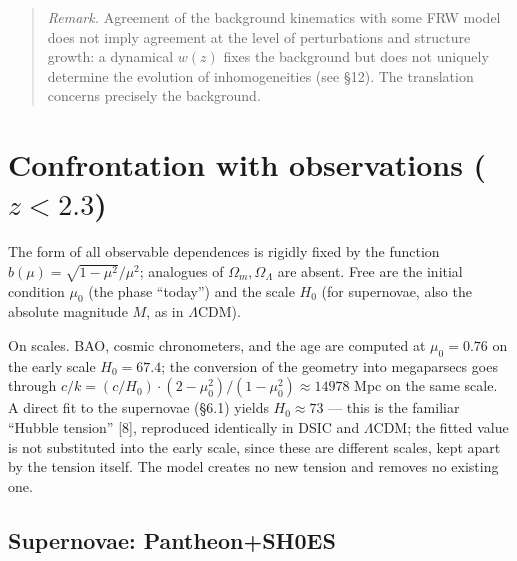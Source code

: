\documentclass{article}
\begin{document}
\begin{quote}
\textit{Remark.} Agreement of the background kinematics with some FRW model does not imply agreement at the level of perturbations and structure growth: a dynamical $w(z)$ fixes the background but does not uniquely determine the evolution of inhomogeneities (see \S12). The translation concerns precisely the background.
\end{quote}
\section{Confrontation with observations ($z < 2.3$)}

The form of all observable dependences is rigidly fixed by the function $b(\mu) = \sqrt{1-\mu^2}/\mu^2$; analogues of $\Omega_m, \Omega_\Lambda$ are absent. Free are the initial condition $\mu_0$ (the phase ``today'') and the scale $H_0$ (for supernovae, also the absolute magnitude $M$, as in $\Lambda$CDM).

On scales. BAO, cosmic chronometers, and the age are computed at $\mu_0 = 0.76$ on the early scale $H_0 = 67.4$; the conversion of the geometry into megaparsecs goes through $c/k = (c/H_0)\cdot(2-\mu_0^2)/(1-\mu_0^2) \approx 14978$ Mpc on the same scale. A direct fit to the supernovae (\S6.1) yields $H_0 \approx 73$ --- this is the familiar ``Hubble tension'' [8], reproduced identically in DSIC and $\Lambda$CDM; the fitted value is not substituted into the early scale, since these are different scales, kept apart by the tension itself. The model creates no new tension and removes no existing one.

\subsection{Supernovae: Pantheon+SH0ES}
\end{document}
